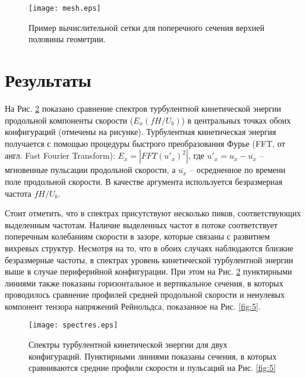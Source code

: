%
\begin{figure}[h!]
  \centering
  \texttt{[image: mesh.eps]}
  \caption{Пример вычислительной сетки для поперечного сечения верхней половины геометрии.}
  \label{fig:3}
\end{figure}


\section{Результаты}\label{ch4:results}
На Рис. \ref{fig:4} показано сравнение спектров турбулентной кинетической энергии продольной компоненты скорости ($E_x(fH/U_b)$) в центральных точках обоих конфигураций (отмечены на рисунке). 
%
Турбулентная кинетическая энергия получается с помощью процедуры быстрого преобразования Фурье (FFT, от англ. Fast Fourier Transform): $E_x = |FFT(u'_x)^2|$, где $u'_x = u_x - \overline{u_x}$ -- мгновенные пульсации продольной скорости, а $\overline{u_x}$ -- осредненное по времени поле продольной скорости. 
%
В качестве аргумента используется безразмерная частота $fH/U_b$.

%
Стоит отметить, что в спектрах присутствуют несколько пиков, соответствующих выделенным частотам. 
%
Наличие выделенных частот в потоке соответствует поперечным колебаниям скорости в зазоре, которые связаны с развитием вихревых структур. 
%
Несмотря на то, что в обоих случаях наблюдаются близкие безразмерные частоты, в спектрах уровень кинетической турбулентной энергии выше в случае периферийной конфигурации.
%
При этом на Рис. \ref{fig:4} пунктирными линиями также показаны горизонтальное и вертикальное сечения, в которых проводилось сравнение профилей средней продольной скорости и ненулевых компонент тензора напряжений Рейнольдса, показанное на Рис. \ref{fig:5}.

%


\begin{figure}[h!]
  \centering
  \texttt{[image: spectres.eps]}
  \caption{Спектры турбулентной кинетической энергии для двух конфигураций. Пунктирными линиями показаны сечения, в которых сравниваются средние профили скорости и пульсаций на Рис. \ref{fig:5}}
  \label{fig:4}
\end{figure}

